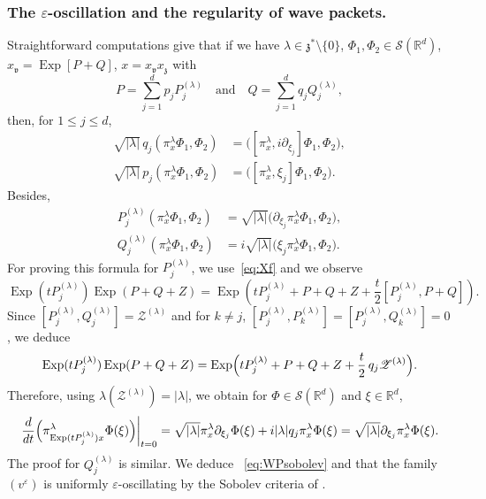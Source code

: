 \documentclass[10pt]{amsart}
\let\mathcal\mathscr
\DeclareMathOperator{\Exp}{Exp}
\theoremstyle{plain}
\theoremstyle{definition}
\let\eps\varepsilon
\def\R{{\mathbb R}}
\begin{document}
\subsubsection{The $\eps$-oscillation and the regularity of wave packets.}
Straightforward computations give that if we have
$\lambda\in {\mathfrak z}^*\setminus \{0\}$, $\Phi_1,\Phi_2\in \mathcal S(\R^d)$,
$x_{\mathfrak v} = \Exp [P+Q]$, $x=x_{\mathfrak v}x_{\mathfrak z}$ with
\[
P=\sum_{j=1}^{d} p_j P_j^{(\lambda)}\quad \text{and} \quad Q=\sum_{j=1}^{d} q_j Q_j^{(\lambda)},
\]
then, for $1\leq j\leq d$,
\begin{equation}\label{est:growth}
\begin{aligned}
\sqrt{|\lambda|} \,q_j \left(\pi^{\lambda}_{x} \Phi_1,\Phi_2\right)&= \bigl([ \pi^{ \lambda}_{x}, i\partial_{\xi_j}]\Phi_1,\Phi_2\bigr),\\
\sqrt{|\lambda|} \, p_j \left(\pi^{ \lambda}_{x} \Phi_1,\Phi_2\right)&= \bigl([\pi^{ \lambda}_{x},\xi_j]\Phi_1,\Phi_2\bigr).
\end{aligned}
\end{equation}
Besides,
\begin{equation}\label{eq:PQWP}
\begin{aligned}
P_j^{(\lambda)} \left(\pi^{\lambda}_{x} \Phi_1,\Phi_2\right)& = \sqrt{|\lambda|} \bigl(\partial_{\xi_j} \pi^{\lambda}_{x}\Phi_1,\Phi_2\bigr),\\
Q_j^{(\lambda)} \left(\pi^{\lambda}_{x} \Phi_1,\Phi_2\right) &= i\sqrt{|\lambda|} \bigl(
\xi_j \pi^\lambda_{x} \Phi_1,\Phi_2\bigr).
\end{aligned}
\end{equation}
For proving this formula for $P_j^{(\lambda)}$, we use~\eqref{eq:Xf} and we observe
\[
\Exp (tP_j^{(\lambda)}) \Exp (P+Q+Z) = \Exp (tP_j^{(\lambda)}+P+Q+Z +\frac t2 [P_j^{(\lambda)},P+Q]).
\]
Since $[P_j^{(\lambda)}, Q_j^{(\lambda)}]= \mathcal Z^{(\lambda)}$ and for $k\not=j$,
$[P_j^{(\lambda)}, P_k^{(\lambda)}]=[P_j^{(\lambda)},Q_k^{(\lambda)}]=0$,
we deduce
\[
\Exp (tP_j^{(\lambda)}) \Exp (P+Q+Z) = \Exp \Bigl(tP_j^{(\lambda)}+P+Q+Z +\frac t2\, q_j {\mathcal Z}^{(\lambda)} \Bigr).
\]
Therefore, using $\lambda(\mathcal Z^{(\lambda)})= |\lambda|$, we obtain for $\Phi\in\mathcal S(\R^d)$ and $\xi\in\R^d$,
\[
\left.\frac d {dt} \Bigl(\pi^\lambda_{ \Exp (tP_j^{(\lambda)}) x} \Phi(\xi) \Bigr)\right|_{t=0} =
\sqrt{|\lambda|} \pi^\lambda_{ x} \partial_{\xi_j} \Phi(\xi)
+i |\lambda| q_j \pi^\lambda_{ x} \Phi(\xi)=\sqrt{|\lambda|} \partial_{\xi_j} \pi^\lambda_{ x}\Phi(\xi).
\]
The proof for $Q_j^{(\lambda)}$ is similar.
We deduce
~\eqref{eq:WPsobolev} and that the family $(v^\eps)$ is uniformly $\eps$-oscillating by the Sobolev criteria of \cite[Prop.\,4.6]{FF1}.
\end{document}
